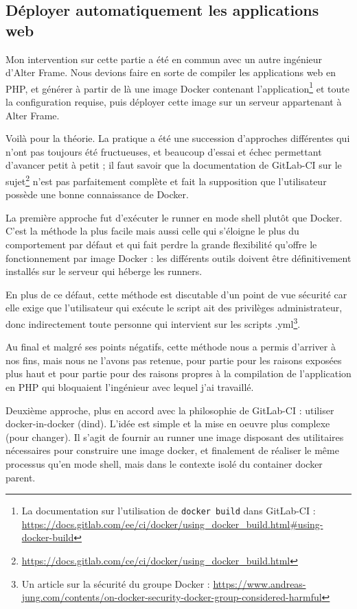 \subsection{Déployer automatiquement les applications web}
Mon intervention sur cette partie a été en commun avec un autre ingénieur d'Alter Frame. Nous devions faire en sorte de compiler les applications web en PHP, et générer à partir de là une image Docker contenant l'application\footnote{La documentation sur l'utilisation de \texttt{docker build} dans GitLab-CI : \url{https://docs.gitlab.com/ee/ci/docker/using_docker_build.html#using-docker-build}} et toute la configuration requise, puis  déployer cette image sur un serveur appartenant à Alter Frame.

Voilà pour la théorie. La pratique a été une succession d'approches différentes qui n'ont pas toujours été fructueuses, et beaucoup d'essai et échec permettant d'avancer petit à petit ; il faut savoir que la documentation de GitLab-CI sur le sujet\footnote{\url{https://docs.gitlab.com/ce/ci/docker/using_docker_build.html}} n'est pas parfaitement complète et fait la supposition que l'utilisateur possède une bonne connaissance de Docker.

La première approche fut d'exécuter le runner en mode shell plutôt que Docker. C'est la méthode la plus facile mais aussi celle qui s'éloigne le plus du comportement par défaut et qui fait perdre la grande flexibilité qu'offre le fonctionnement par image Docker : les différents outils doivent être définitivement installés sur le serveur qui héberge les runners. 

En plus de ce défaut, cette méthode est discutable d'un point de vue sécurité car elle exige que l'utilisateur qui exécute le script ait des privilèges administrateur, donc indirectement toute personne qui intervient sur les scripts .yml\footnote{Un article sur la sécurité du groupe Docker : \url{https://www.andreas-jung.com/contents/on-docker-security-docker-group-considered-harmful}}.

Au final et malgré ses points négatifs, cette méthode nous a permis d'arriver à nos fins, mais nous ne l'avons pas retenue, pour partie pour les raisons exposées plus haut et pour partie pour des raisons propres à la compilation de l'application en PHP qui bloquaient l'ingénieur avec lequel j'ai travaillé. 

Deuxième approche, plus en accord avec la philosophie de GitLab-CI : utiliser docker-in-docker (dind). L'idée est simple et la mise en oeuvre plus complexe (pour changer). Il s'agit de fournir au runner une image disposant des utilitaires nécessaires pour construire une image docker, et finalement de réaliser le même processus qu'en mode shell, mais dans le contexte isolé du container docker parent.

